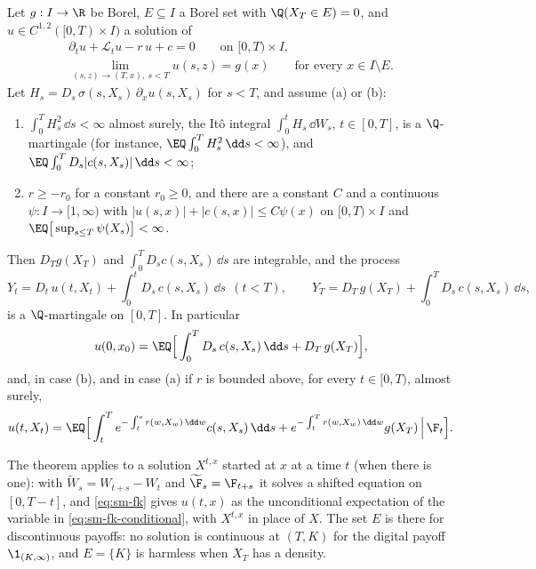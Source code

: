 \begin{theorem}\label{thm:sm-feynman-kac}
Let $g:I\to\R$ be Borel, $E\subseteq I$ a Borel set with $\Q(X_T\in E)=0$, and
$u\in C^{1,2}([0,T)\times I)$ a solution of
\begin{gather}
  \partial_tu+\mathcal L_tu-r\,u+c=0\qquad\text{on }[0,T)\times I,\label{eq:sm-fk-pde}\\
  \lim_{(s,z)\to(T,x),\ s<T}u(s,z)=g(x)\qquad\text{for every }x\in I\setminus E.\label{eq:sm-fk-terminal}
\end{gather}
Let $H_s=D_s\,\sigma(s,X_s)\,\partial_xu(s,X_s)$ for $s<T$, and assume (a) or (b):
\begin{enumerate}[label=(\alph*)]
  \item $\int_0^TH_s^2\,\dd s<\infty$ almost surely, the It\^o integral $\int_0^tH_s\,\dd W_s$,
    $t\in[0,T]$, is a $\Q$-martingale (for instance, $\EQ\int_0^TH_s^2\,\dd s<\infty$), and
    $\EQ\int_0^TD_s|c(s,X_s)|\,\dd s<\infty$;
  \item $r\ge-r_0$ for a constant $r_0\ge0$, and there are a constant $C$ and a continuous
    $\psi:I\to[1,\infty)$ with $|u(s,x)|+|c(s,x)|\le C\psi(x)$ on $[0,T)\times I$ and
    $\EQ\big[\sup_{s\le T}\psi(X_s)\big]<\infty$.
\end{enumerate}
Then $D_Tg(X_T)$ and $\int_0^TD_sc(s,X_s)\,\dd s$ are integrable, and the process
\[
  Y_t=D_t\,u(t,X_t)+\int_0^tD_s\,c(s,X_s)\,\dd s\ \ (t<T),\qquad
  Y_T=D_T\,g(X_T)+\int_0^TD_s\,c(s,X_s)\,\dd s,
\]
is a $\Q$-martingale on $[0,T]$. In particular
\begin{equation}\label{eq:sm-fk}
  u(0,x_0)=\EQ\Big[\int_0^TD_s\,c(s,X_s)\,\dd s+D_T\,g(X_T)\Big],
\end{equation}
and, in case (b), and in case (a) if $r$ is bounded above, for every $t\in[0,T)$, almost surely,
\begin{equation}\label{eq:sm-fk-conditional}
  u(t,X_t)=\EQ\Big[\int_t^Te^{-\int_t^sr(w,X_w)\,\dd w}c(s,X_s)\,\dd s
  +e^{-\int_t^Tr(w,X_w)\,\dd w}g(X_T)\,\Big|\,\F_t\Big].
\end{equation}
\end{theorem}

The theorem applies to a solution $X^{t,x}$ started at $x$ at a time $t$ (when there is one):
with $\widetilde W_s=W_{t+s}-W_t$ and $\widetilde\F_s=\F_{t+s}$ it solves a shifted equation on
$[0,T-t]$, and \eqref{eq:sm-fk} gives $u(t,x)$ as the unconditional expectation of the variable in
\eqref{eq:sm-fk-conditional}, with $X^{t,x}$ in place of $X$. The set $E$ is there for discontinuous payoffs: no solution is
continuous at $(T,K)$ for the digital payoff $\1_{(K,\infty)}$, and $E=\{K\}$ is harmless when
$X_T$ has a density.

